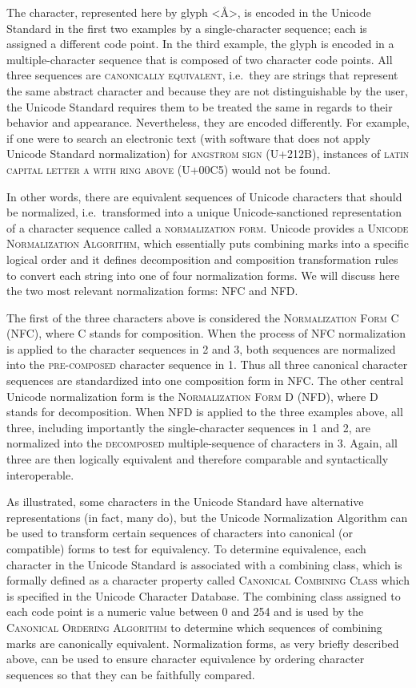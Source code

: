 The character, represented here by glyph <Å>, is encoded in the Unicode Standard
in the first two examples by a single-character sequence; each is assigned a
different code point. In the third example, the glyph is encoded in a
multiple-character sequence that is composed of two character code points. All
three sequences are \textsc{canonically equivalent}, i.e.~they are strings that
represent the same abstract character and because they are not distinguishable
by the user, the Unicode Standard requires them to be treated the same in
regards to their behavior and appearance. Nevertheless, they are encoded
differently. For example, if one were to search an electronic text (with
software that does not apply Unicode Standard normalization) for
\textsc{angstrom sign} (U+212B), instances of \textsc{latin capital letter a
with ring above} (U+00C5) would not be found.

In other words, there are equivalent sequences of Unicode characters that should
be normalized, i.e.~transformed into a unique Unicode-sanctioned representation
of a character sequence called a \textsc{normalization form}. Unicode provides a
\textsc{Unicode Normalization Algorithm}, which essentially puts combining marks
into a specific logical order and it defines decomposition and composition
transformation rules to convert each string into one of four normalization
forms. We will discuss here the two most relevant normalization forms: NFC and
NFD.

The first of the three characters above is considered the \textsc{Normalization
Form C (NFC)}, where \textsc{C} stands for composition. When the process of NFC
normalization is applied to the character sequences in 2 and 3, both sequences
are normalized into the \textsc{pre-composed} character sequence in 1. Thus all
three canonical character sequences are standardized into one composition form
in NFC. The other central Unicode normalization form is the
\textsc{Normalization Form D (NFD)}, where \textsc{D} stands for decomposition.
When NFD is applied to the three examples above, all three, including
importantly the single-character sequences in 1 and 2, are normalized into the
\textsc{decomposed} multiple-sequence of characters in 3. Again, all three are
then logically equivalent and therefore comparable and syntactically
interoperable.

As illustrated, some characters in the Unicode Standard have alternative
representations (in fact, many do), but the Unicode Normalization Algorithm can
be used to transform certain sequences of characters into canonical (or
compatible) forms to test for equivalency. To determine equivalence, each
character in the Unicode Standard is associated with a combining class, which is
formally defined as a character property called \textsc{Canonical Combining
Class} which is specified in the Unicode Character Database. The combining class
assigned to each code point is a numeric value between 0 and 254 and is used by
the \textsc{Canonical Ordering Algorithm} to determine which sequences of
combining marks are canonically equivalent. Normalization forms, as very briefly
described above, can be used to ensure character equivalence by ordering
character sequences so that they can be faithfully compared.

